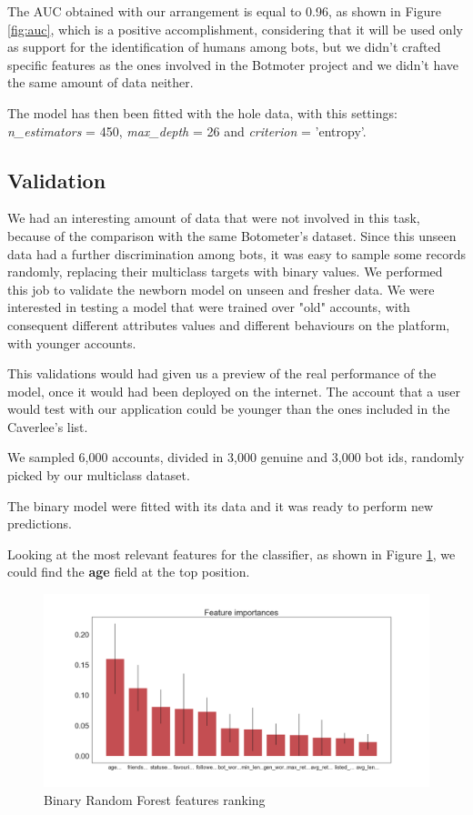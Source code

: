 The AUC obtained with our arrangement is equal to 0.96, as shown in Figure \ref{fig:auc}, which is a positive accomplishment, considering that it will be used only as support for the identification of humans among bots, but we didn't crafted specific features as the ones involved in the Botmoter project and we didn't have the same amount of data neither.

The model has then been fitted with the hole data, with this settings: \textit{ n\_estimators} = 450, \textit{max\_depth} = 26 and \textit{criterion} = 'entropy'.

\subsection{Validation}

We had an interesting amount of data that were not involved in this task, because of the comparison with the same Botometer's dataset. Since this unseen data had a further discrimination among bots, it was easy to sample some records randomly, replacing their multiclass targets with binary values.
We performed this job to validate the newborn model on unseen and fresher data.
We were interested in testing a model that were trained over "old" accounts, with consequent different attributes values and different behaviours on the platform, with younger accounts.

This validations would had given us a preview of the real performance of the model, once it would had been deployed on the internet. The account that a user would test with our application could be younger than the ones included in the Caverlee's list.

We sampled 6,000 accounts, divided in 3,000 genuine and 3,000 bot ids, randomly picked by our multiclass dataset.

The binary model were fitted with its data and it was ready to perform new predictions.

Looking at the most relevant features for the classifier, as shown in Figure \ref{fig:bon_importances}, we could find the \textbf{age} field at the top position.

\begin{figure}[htp!]
	\centering
	\includegraphics[width=\columnwidth]{chapter5/figure/bon_importances.png}
	\caption{Binary Random Forest features ranking}
	\label{fig:bon_importances}
\end{figure}

